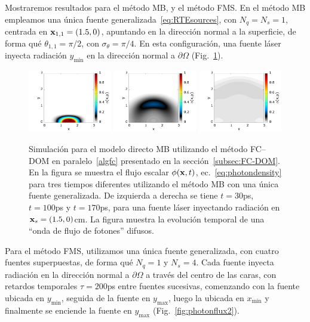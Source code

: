 Mostraremos resultados para el método MB, y el método FMS. 
En el método MB empleamos una única fuente generalizada~\eqref{eq:RTEsources}, 
con $N_q=N_s=1$, centrada en $\mathbf{x}_{1,1}=(1.5,0)$, apuntando en la dirección 
normal a la superficie, de forma qué $\theta_{1,1}=\pi/2$, con $\sigma_{\theta}=\pi/4$. 
En esta configuración, una fuente láser inyecta radiación $y_{\text{min}}$ en la dirección 
normal a $\partial \Omega$ (Fig.~\ref{fig:photonflux}).
\begin{figure}[h!]
\centering
  \includegraphics[width=0.325\textwidth]{figuras/sim_MB_t30.png}
  \includegraphics[width=0.325\textwidth]{figuras/sim_MB_t100.png}
  \includegraphics[width=0.325\textwidth]{figuras/sim_MB_t170.png}
  \caption{Simulación para el modelo directo MB utilizando 
  el método FC--DOM en paralelo~\ref{algfc} presentado en 
  la sección~\ref{subsec:FC-DOM}. En la figura se muestra el 
  flujo escalar $\phi(\mathbf{x},t)$, ec.~\eqref{eq:photondensity} para tres tiempos 
  diferentes utilizando el método MB con una única fuente generalizada. De 
  izquierda a derecha se tiene $t=30$ps, 
$t=100$ps y $t=170$ps, para una fuente láser 
inyectando radiación en  $\mathbf{x}_s=(1.5,0)$cm. La figura muestra la evolución 
temporal de una ``onda de flujo de fotones'' difusos.}
 \label{fig:photonflux}
\end{figure}
 
Para el método FMS, utilizamos una única fuente generalizada, con cuatro 
fuentes superpuestas, de forma qué $N_q=1$ y $N_s=4$. Cada fuente inyecta 
radiación en la dirección normal a $\partial \Omega$ a través del 
centro de las caras, con retardos temporales $\tau=200$ps entre fuentes sucesivas, 
comenzando con la fuente ubicada en $y_{\text{min}}$, seguida de la fuente 
en $y_{\text{max}}$, luego la ubicada en $x_{\text{min}}$ y finalmente 
se enciende la fuente en $y_{\text{max}}$ (Fig.~\ref{fig:photonflux2}).   
 

